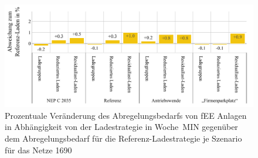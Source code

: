 \begin{figure}[H]
    \centering
    \includegraphics[width=\textwidth]{Bilder/1690_cur_fee_grid_week_A}
    \caption{Prozentuale Veränderung des Abregelungsbedarfs von fEE Anlagen in Abhängigkeit von der Ladestrategie in Woche~MIN gegenüber dem Abregelungsbedarf für die Referenz-Ladestrategie je Szenario für das Netze \num{1690}}\label{fig:1690_cur_fee_grid_week_A}
\end{figure}